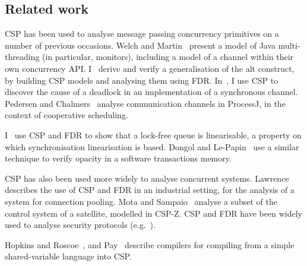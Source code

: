 
\subsection{Related work}

CSP has been used to analyse message passing concurrency primitives on a
number of previous occasions.
%
Welch and Martin~\cite{welch-martin} present a model of Java multi-threading
(in particular, monitors), including a model of a channel within their own
concurrency API\@.
%
I~\cite{gavin:alt} derive and verify a generalisation of the
alt construct, by building CSP models and analysing them using FDR.  
%
In~\cite{gavin:OneOne}, I use CSP to discover the cause of a deadlock in an
implementation of a synchronous channel. 
%
Pedersen and Chalmers~\cite{PC23} analyse communication channels in ProcessJ,
in the context of cooperative scheduling.

I~\cite{gavin:lock-free-queue} use CSP and FDR to show that a lock-free queue
is linearisable, a property on which synchronisation linearisation is based.
Dongol and Le-Papin~\cite{DlP:opacity} use a similar technique to verify
opacity in a software transactions memory. 

CSP has also been used more widely to analyse concurrent systems. 
%
Lawrence~\cite{lawrence} describes the use of CSP and FDR in an
industrial setting, for the analysis of a system for connection pooling.
% 
Mota and Sampaio~\cite{mota+sampaio} analyse a subset of the
control system of a satellite, modelled in CSP-Z\@.  
%
CSP and FDR have been widely used to analyse security protocols
(e.g.~\cite{gavin:NSFDR}).

Hopkins and Roscoe~\cite{hopkins-roscoe}, and Pay~\cite{alex:project} describe
compilers for compiling from a simple shared-variable language into CSP\@.






